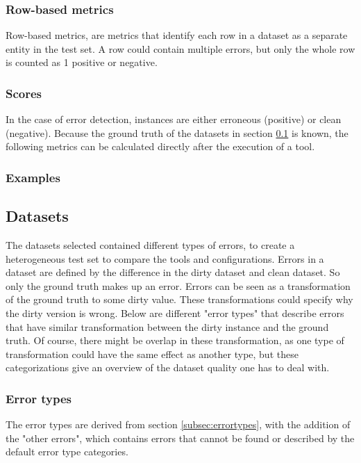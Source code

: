 \subsubsection{Row-based metrics}
Row-based metrics, are metrics that identify each row in a dataset as a separate entity in the test set. A row could contain multiple errors, but only the whole row is counted as 1 positive or negative.

\subsubsection{Scores}
In the case of error detection, instances are either erroneous (positive) or clean (negative). Because the ground truth of the datasets in section \ref{subsec:datasets} is known, the following metrics can be calculated directly after the execution of a tool.

\subsubsection{Examples}


\subsection{Datasets}
\label{subsec:datasets}
The datasets selected contained different types of errors, to create a heterogeneous test set to compare the tools and configurations. Errors in a dataset are defined by the difference in the dirty dataset and clean dataset. So only the ground truth makes up an error. Errors can be seen as a transformation of the ground truth to some dirty value. These transformations could specify why the dirty version is wrong. Below are different "error types" that describe errors that have similar transformation between the dirty instance and the ground truth. Of course, there might be overlap in these transformation, as one type of transformation could have the same effect as another type, but these categorizations give an overview of the dataset quality one has to deal with.

\subsubsection{Error types}
The error types are derived from section \ref{subsec:errortypes}, with the addition of the "other errors", which contains errors that cannot be found or described by the default error type categories.

